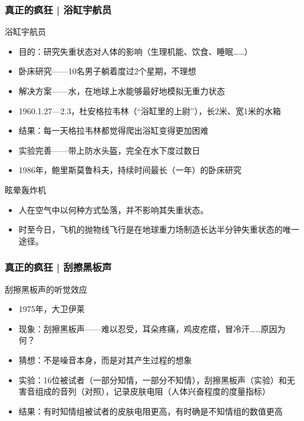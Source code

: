 \begin{frame}
  \frametitle{真正的疯狂 | 浴缸宇航员}
  \begin{block}{浴缸宇航员}
    \begin{itemize}
      \item 目的：研究失重状态对人体的影响（生理机能、饮食、睡眠……）
    \pause
      \item 卧床研究——10名男子躺着度过2个星期，不理想
      \item 解决方案——水，在地球上水能够最好地模拟无重力状态
      \item 1960.1.27—2.3，杜安\textbullet 格拉韦林（“浴缸里的上尉”），长2米、宽1米的水箱
      \item 结果：每一天格拉韦林都觉得爬出浴缸变得更加困难
      \item 实验完善——带上防水头盔，完全在水下度过数日
      \item 1986年，鲍里斯\textbullet 莫鲁科夫，持续时间最长（一年）的卧床研究
    \end{itemize}
  \end{block}
  \pause
  \begin{block}{眩晕轰炸机}
    \begin{itemize}
      \item 人在空气中以何种方式坠落，并不影响其失重状态。
      \item 时至今日，飞机的抛物线飞行是在地球重力场制造长达半分钟失重状态的唯一途径。
    \end{itemize}
  \end{block}
\end{frame}

\begin{frame}
  \frametitle{真正的疯狂 | 刮擦黑板声}
  \begin{block}{刮擦黑板声的听觉效应}
    \begin{itemize}
      \item 1975年，大卫\textbullet 伊莱
      \item 现象：刮擦黑板声——难以忍受，耳朵疼痛，鸡皮疙瘩，冒冷汗……原因为何？
    \pause
      \item 猜想：不是噪音本身，而是对其产生过程的想象
      \item 实验：16位被试者（一部分知情，一部分不知情），刮擦黑板声（实验）和无害音组成的音列（对照），记录皮肤电阻（人体兴奋程度的度量指标）
      \item 结果：有时知情组被试者的皮肤电阻更高，有时确是不知情组的数值更高
    \end{itemize}
  \end{block}
\end{frame}

